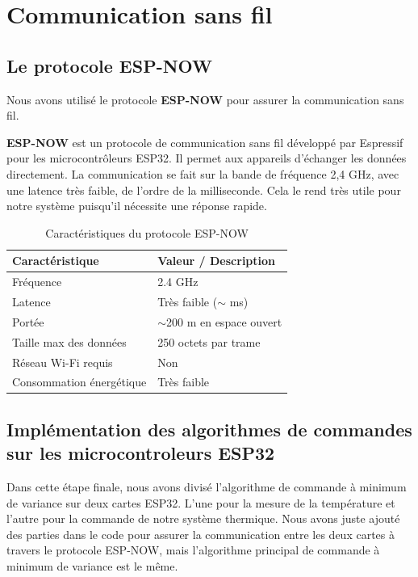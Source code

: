 \section{Communication sans fil}

\subsection{Le protocole ESP-NOW}

Nous avons utilisé le protocole \textbf{ESP-NOW} pour assurer la communication sans fil.

\textbf{ESP-NOW} est un protocole de communication sans fil développé par Espressif pour les microcontrôleurs ESP32. Il permet aux appareils d'échanger les données directement. La communication se fait sur la bande de fréquence 2,4 GHz, avec une latence très faible, de l'ordre de la milliseconde. Cela le rend très utile pour notre système puisqu'il nécessite une réponse rapide.

\begin{table}[H]
	\centering
	\caption{Caractéristiques du protocole ESP-NOW}
	\label{tab:esp_now}
	\begin{tabular}{|l|l|}
		\hline
		\textbf{Caractéristique} & \textbf{Valeur / Description} \\
		\hline
		Fréquence & 2.4 GHz \\
		\hline
		Latence & Très faible ($\sim$ ms) \\
		\hline
		Portée & $\sim$200 m en espace ouvert \\
		\hline
		Taille max des données & 250 octets par trame \\
		\hline
		Réseau Wi-Fi requis & Non \\
		\hline
		Consommation énergétique & Très faible \\
		\hline
	\end{tabular}
\end{table}

\subsection{Implémentation des algorithmes de commandes  sur les microcontroleurs ESP32}

Dans cette étape finale, nous avons divisé l'algorithme de commande à minimum de variance sur deux cartes ESP32. L'une pour la mesure de la température et l'autre pour la commande de notre système thermique. Nous avons juste ajouté des parties dans le code pour assurer la communication entre les deux cartes à travers le protocole ESP-NOW, mais l'algorithme principal de commande à minimum de variance est le même.

